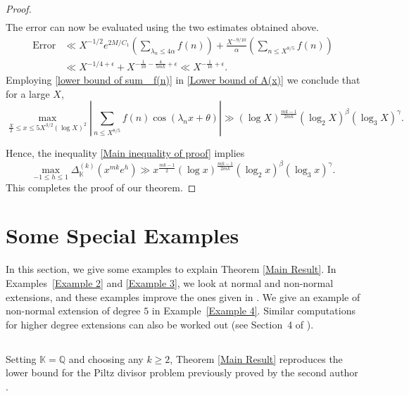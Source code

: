 \documentclass[reqno]{amsart}
\numberwithin{equation}{section}
\theoremstyle{plain}
\begin{document}
\begin{proof}
\begin{align}
\end{align}
The error can now be evaluated using the two estimates obtained above.
\begin{align*}
	\text{Error} &\ll X^{-1/2} e^{2M/C_1} \left(\sum_{\lambda_n\leq 4\alpha}f(n)\right)+ \frac{X^{-9/10}}{\alpha} \left( \sum_{n\leq X^{8/5}}f(n)\right)\\
	&\ll X^{-1/4+\epsilon} + X^{-\frac{1}{10}-\frac{4}{5mk}+\epsilon} \ll X^{-\frac{1}{10} +\epsilon}.
\end{align*}
Employing \eqref{lower bound of sum_ f(n)} in \eqref{Lower bound of A(x)} we conclude that for a large $X$,
\begin{equation*}
\max_{\frac{X}{2}\leq x \leq 5 X^{3/2}(\log X)^2} \left|\sum_{n\leq X^{8/5}}f(n)\cos(\lambda_nx +\theta)\right|\gg (\log X)^{\frac{mk-1}{2mk}} (\log_2 X)^{\beta} (\log_3 X)^{\gamma}.
\end{equation*}

Hence, the inequality \eqref{Main inequality of proof} implies 
\begin{equation*}
	\max_{-1\leq h\leq 1} \Delta_{\mathbb{K}}^{(k)}\left(x^{mk}e^h\right) \gg x^{\frac{mk-1}{2}} (\log x)^{\frac{mk-1}{2mk}} (\log_2 x)^{\beta} (\log_3 x)^{\gamma}.
\end{equation*}
This completes the proof of our theorem.
 \end{proof}







\section{Some Special Examples}
In this section, we give some examples to explain Theorem \ref{Main Result}. In Examples~\ref{Example 2} and \ref{Example 3}, we look at normal and non-normal extensions, and these examples improve the ones given in \cite{GKMN}. We give an example of non-normal extension of degree $5$ in Example~\ref{Example 4}. Similar computations for higher degree extensions can also be worked out (see Section~4 of \cite{GKMN}).
\subsection{} 
Setting $\mathbb{K} = \mathbb{Q}$ and choosing any $k \geq 2$, Theorem \ref{Main Result} reproduces the lower bound for the Piltz divisor problem previously proved by the second author \cite{K. Mahatab}.
% 
\end{document}
